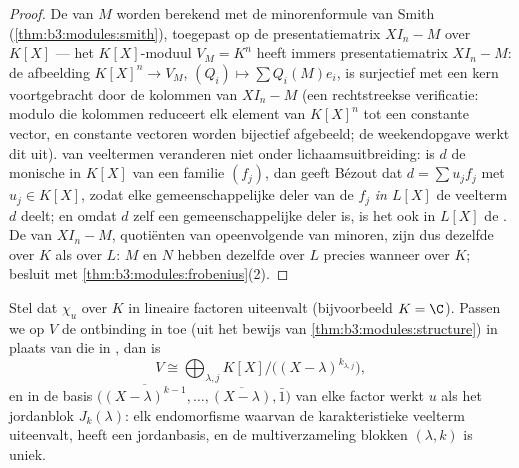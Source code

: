 \begin{proof}
De  van $M$ worden berekend met de
minorenformule van Smith (\cref{thm:b3:modules:smith}), toegepast
op de presentatiematrix $XI_n - M$ over $K[X]$ --- het
$K[X]$-moduul $V_M = K^n$ heeft immers presentatiematrix $XI_n -
M$: de afbeelding $K[X]^n \to V_M$, $(Q_i) \mapsto \sum
Q_i(M)e_i$, is surjectief met een kern voortgebracht door de
kolommen van $XI_n - M$ (een rechtstreekse verificatie: modulo die
kolommen reduceert elk element van $K[X]^n$ tot een constante
vector, en constante vectoren worden bijectief afgebeeld; de
weekendopgave werkt dit uit).  van
veeltermen veranderen niet onder lichaamsuitbreiding: is $d$ de
monische  in $K[X]$ van een familie $(f_j)$,
dan geeft Bézout dat $d = \sum u_jf_j$ met $u_j \in K[X]$, zodat
elke gemeenschappelijke deler van de $f_j$ \emph{in $L[X]$} de
veelterm $d$ deelt; en omdat $d$ zelf een gemeenschappelijke deler
is, is het ook in $L[X]$ de . De  van $XI_n - M$, quotiënten van opeenvolgende  van minoren, zijn dus dezelfde over $K$ als over
$L$: $M$ en $N$ hebben dezelfde  over
$L$ precies wanneer over $K$; besluit met
\cref{thm:b3:modules:frobenius}(2).
\end{proof}

\begin{theorem}\label{thm:b3:modules:jordan}
Stel dat $\chi_u$ over $K$ in lineaire factoren uiteenvalt
(bijvoorbeeld $K = \C$). Passen we op $V$ de ontbinding in
 toe (uit het bewijs van
\cref{thm:b3:modules:structure}) in plaats van die in , dan is
\[
V \cong \bigoplus_{\lambda, j} K[X]\big/\bigl((X -
\lambda)^{k_{\lambda,j}}\bigr),
\]
en in de basis $\bigl(\overline{(X-\lambda)^{k-1}}, \dots,
\overline{(X - \lambda)}, \bar 1\bigr)$ van elke factor werkt $u$
als het jordanblok $J_k(\lambda)$: elk endomorfisme waarvan de
karakteristieke veelterm uiteenvalt, heeft een jordanbasis, en de
multiverzameling blokken $(\lambda, k)$ is uniek.
\end{theorem}


